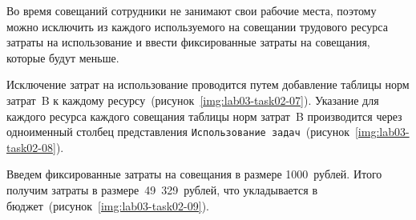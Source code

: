Во время совещаний сотрудники не занимают свои рабочие места, поэтому можно
исключить из каждого используемого на совещании трудового ресурса затраты на
использование и ввести фиксированные затраты на совещания, которые будут
меньше.

Исключение затрат на использование проводится путем добавление таблицы норм
затрат~B к каждому ресурсу~(рисунок~\ref{img:lab03-task02-07}). Указание для
каждого ресурса каждого совещания таблицы норм затрат~B производится через
одноименный столбец представления \texttt{Использование
задач}~(рисунок~\ref{img:lab03-task02-08}).



Введем фиксированные затраты на совещания в размере 1000~рублей. Итого получим
затраты в размере~49~329~рублей, что укладывается в бюджет~(рисунок~\ref{img:lab03-task02-09}).

